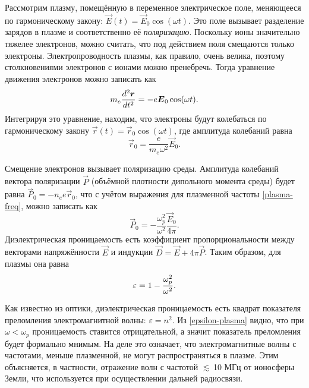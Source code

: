 \label{sec:epsilon}
Рассмотрим плазму, помещённую в переменное электрическое поле, меняющееся
по гармоническому закону: $\vec{E}(t)=\vec{E}_0 \cos (\omega t)$. 
Это поле вызывает разделение зарядов в плазме и соответственно её \emph{поляризацию}.
Поскольку ионы значительно тяжелее электронов, можно считать, что
под действием поля смещаются только электроны. Электропроводность
плазмы, как правило, очень велика, поэтому столкновениями электронов
с ионами можно пренебречь. Тогда уравнение движения электронов можно записать как
\begin{equation}
\eqmark{free_E}
m_e \frac{d^2 \vec{r}}{dt^2} = - e \vec{E}_0 \cos(\omega t).
\end{equation}
Интегрируя это уравнение, находим, что электроны будут колебаться по 
гармоническому закону
$\vec{r}(t) = \vec{r}_0 \cos(\omega t)$, где амплитуда колебаний равна
\[
\vec{r}_0 = \frac{e}{m_e\omega^2} \vec{E}_0.
\]

Смещение электронов вызывает поляризацию среды. Амплитуда колебаний 
вектора поляризации $\vec{P}$ (объёмной плотности дипольного момента среды) будет равна
$\vec{P}_0 = -n_e e \vec{r}_0$, что 
с учётом выражения для плазменной частоты \eqref{plasma-freq},
можно записать как
\[
\vec{P}_0 = -\frac{\omega_p^2}{\omega^2} \frac{\vec{E}_0}{4\pi}.
\]
Диэлектрическая проницаемость есть коэффициент пропорциональности
между векторами напряжённости $\vec{E}$ и индукции $\vec{D}=\vec{E}+4\pi \vec{P}$.
Таким образом, для плазмы она равна
\begin{equation}
\eqmark{epsilon-plasma}
\varepsilon = 1 - \frac{\omega_p^2}{\omega^2}.
\end{equation}


\begin{lab:example}
Как известно из оптики, диэлектрическая проницаемость есть
квадрат показателя преломления электромагнитной волны: $\varepsilon=n^2$.
Из \eqref{epsilon-plasma} видно, что при $\omega<\omega_p$ проницаемость
ставится отрицательной, а значит показатель преломления будет формально мнимым.
 На деле это означает, что электромагнитные волны с частотами, меньше плазменной,
 не могут распространяться в плазме. Этим объясняется, в частности, 
 отражение волн с частотой $\lesssim$\,10 МГц от ионосферы Земли, 
 что используется при осуществлении дальней радиосвязи.
\end{lab:example}


\label{sec:zonds}


